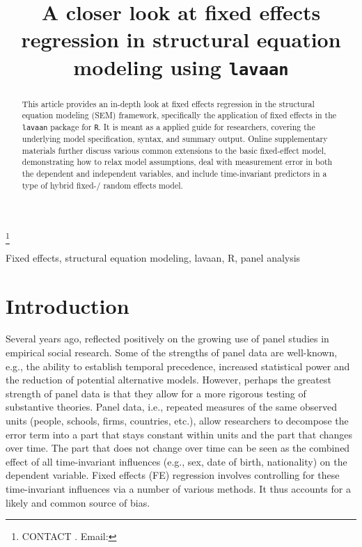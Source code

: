 \documentclass[]{interact}
\theoremstyle{plain}%
\theoremstyle{definition}
\theoremstyle{remark}
\begin{document}
\articletype{}

\title{A closer look at fixed effects regression in structural equation
modeling using \texttt{lavaan}}


\author{
}

\thanks{CONTACT . Email: }

\maketitle

\begin{abstract}
This article provides an in-depth look at fixed effects regression in
the structural equation modeling (SEM) framework, specifically the
application of fixed effects in the \texttt{lavaan} package for
\texttt{R}. It is meant as a applied guide for researchers, covering the
underlying model specification, syntax, and summary output. Online
supplementary materials further discuss various common extensions to the
basic fixed-effect model, demonstrating how to relax model assumptions,
deal with measurement error in both the dependent and independent
variables, and include time-invariant predictors in a type of hybrid
fixed-/ random effects model.
\end{abstract}

\begin{keywords}
Fixed effects, structural equation modeling, lavaan, R, panel analysis
\end{keywords}

\newpage

\setcounter{page}{1}

\doublespacing

\hypertarget{intro}{%
\section{Introduction}\label{intro}}

Several years ago, \citet{Curran2011} reflected positively on the
growing use of panel studies in empirical social research. Some of the
strengths of panel data are well-known, e.g., the ability to establish
temporal precedence, increased statistical power and the reduction of
potential alternative models. However, perhaps the greatest strength of
panel data is that they allow for a more rigorous testing of substantive
theories. Panel data, i.e., repeated measures of the same observed units
(people, schools, firms, countries, etc.), allow researchers to
decompose the error term into a part that stays constant within units
and the part that changes over time. The part that does not change over
time can be seen as the combined effect of all time-invariant influences
(e.g., sex, date of birth, nationality) on the dependent variable. Fixed
effects (FE) regression involves controlling for these time-invariant
influences via a number of various methods. It thus accounts for a
likely and common source of bias.
\end{document}
